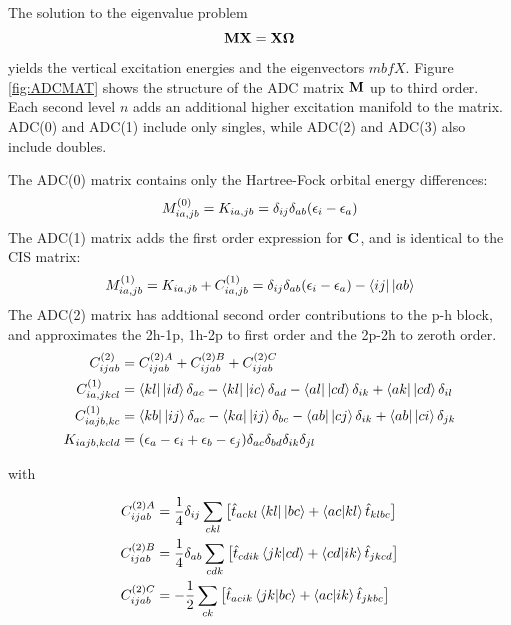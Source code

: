 The solution to the eigenvalue problem
\begin{equation}
\mathbf{M}\mathbf{X} = \mathbf{X}\mathbf{\Omega}
\end{equation}
\noindent yields the vertical excitation energies and the eigenvectors $mbf{X}$. Figure \ref{fig:ADCMAT} shows the structure of the ADC matrix $\mathbf{M}$ up to third order. Each second level $n$ adds an additional higher excitation manifold to the matrix. ADC(0) and ADC(1) include only singles, while ADC(2) and ADC(3) also include doubles.

The ADC(0) matrix contains only the Hartree-Fock orbital energy differences:
\begin{equation}
M^{(0)}_{ia,jb} = K_{ia,jb} = \delta_{ij}\delta_{ab} (\epsilon_i - \epsilon_a) 
\end{equation}
\noindent The ADC(1) matrix adds the first order expression for $\mathbf{C}$, and is identical to the CIS matrix:
\begin{equation}
M^{(1)}_{ia,jb} = K_{ia,jb} + C_{ia,jb}^{(1)} = \delta_{ij}\delta_{ab} (\eps_i - \eps_a) - \sbra{ij}\sket{ab}
\end{equation} 
\noindent The ADC(2) matrix has addtional second order contributions to the p-h block, and approximates the 2h-1p, 1h-2p to first order and the 2p-2h to zeroth order. 
\begin{align}
C_{ijab}^{(2)} &= C_{ijab}^{(2)A} + C_{ijab}^{(2)B} + C_{ijab}^{(2)C} 
\\
C_{ia,jkcl}^{(1)} &= \sbra{kl} \sket{id} \delta_{ac} - \sbra{kl} \sket{ic} \delta_{ad} - \sbra{al} \sket{cd} \delta_{ik} + \sbra{ak} \sket{cd} \delta_{il} 
\\
C_{iajb,kc}^{(1)} &= \sbra{kb} \sket{ij} \delta_{ac} - \sbra{ka} \sket{ij} \delta_{bc} - \bra{ab} \sket{cj} \delta_{ik} + \sbra{ab} \sket{ci} \delta_{jk} 
\\
K_{iajb,kcld} &= (\epsilon_a - \epsilon_i + \epsilon_b - \epsilon_j) \delta_{ac} \delta_{bd} \delta_{ik} \delta_{jl} 
\end{align}

\noindent with

\begin{align}
C_{ijab}^{(2)A} &= \frac{1}{4} \delta_{ij} \sum_{ckl} \left[  \hat{t}_{ackl} \bra{kl} \sket{bc}  +  \bra{ac} \ket{kl} \hat{t}_{klbc}\right] \\
C_{ijab}^{(2)B} &= \frac{1}{4} \delta_{ab} \sum_{cdk} \left[ \hat{t}_{cdik} \bra{jk} \ket{cd} + \bra{cd} \ket{ik} \hat{t}_{jkcd} \right] \\
C_{ijab}^{(2)C} &= - \frac{1}{2} \sum_{ck} \left[ \hat{t}_{acik}  \bra{jk} \ket{bc} + \bra{ac} \ket{ik} \hat{t}_{jkbc} \right] 
\end{align}

